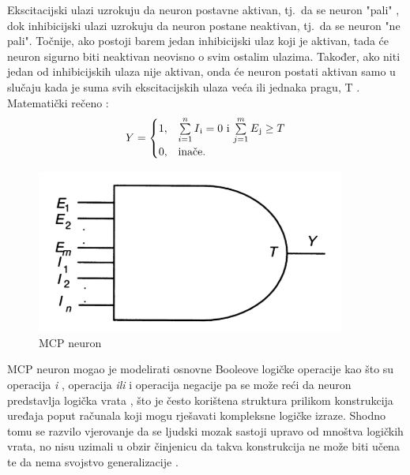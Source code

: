 \documentclass[times, utf8, zavrsni]{fer}
\begin{document}
Ekscitacijski ulazi uzrokuju da neuron postavne aktivan, tj.\ da se neuron "pali" , dok inhibicijski ulazi uzrokuju da neuron postane neaktivan, tj.\ da se neuron "ne pali". Točnije, ako postoji barem jedan inhibicijski ulaz koji je aktivan, tada će neuron sigurno biti neaktivan neovisno o svim ostalim ulazima. Također, ako niti jedan od inhibicijskih ulaza nije aktivan, onda će neuron postati aktivan samo u slučaju kada je suma svih ekscitacijskih ulaza veća ili jednaka pragu, T \citep{McCullPits}. Matematički rečeno \citep{picton2000}:
\begin{equation}
\label{mcp:eq}
    Y = 
    \begin{cases}
        1, & \text{$\sum\limits_{i=1}^n I\textsubscript{i} = 0$ i $\sum\limits_{j=1}^m E\textsubscript{j} \geq T$} \\
        0, & \text{inače.}
    \end{cases}
\end{equation}

\begin{figure}[H]
    \centering
    \includegraphics{img/first-ai-neuron.png}
    \caption[Caption for LOF]{MCP neuron\footnotemark}
    \label{fig:first-ai-neuron}
\end{figure}

MCP neuron mogao je modelirati osnovne Booleove logičke operacije kao što su operacija \textit{i} , operacija \textit{ili}  i operacija negacije  pa se može reći da neuron predstavlja logička vrata , što je često korištena struktura prilikom konstrukcija uređaja poput računala koji mogu rješavati kompleksne logičke izraze. Shodno tomu se razvilo vjerovanje da se ljudski mozak sastoji upravo od mnoštva logičkih vrata, no nisu uzimali u obzir činjenicu da takva konstrukcija ne može biti učena te da nema svojstvo generalizacije \citep{picton2000}. 
\end{document}
